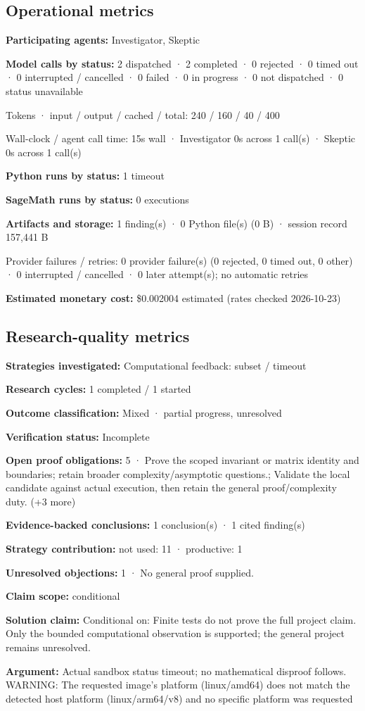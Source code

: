 \documentclass[11pt]{article}
\begin{document}
\subsection{Operational metrics}
\textbf{Participating agents:} Investigator, Skeptic\par
\textbf{Model calls by status:} 2 dispatched · 2 completed · 0 rejected · 0 timed out · 0 interrupted / cancelled · 0 failed · 0 in progress · 0 not dispatched · 0 status unavailable\par
Tokens · input / output / cached / total: 240 / 160 / 40 / 400\par
Wall-clock / agent call time: 15s wall · Investigator 0s across 1 call(s) · Skeptic 0s across 1 call(s)\par
\textbf{Python runs by status:} 1 timeout\par
\textbf{SageMath runs by status:} 0 executions\par
\textbf{Artifacts and storage:} 1 finding(s) · 0 Python file(s) (0 B) · session record 157,441 B\par
Provider failures / retries: 0 provider failure(s) (0 rejected, 0 timed out, 0 other) · 0 interrupted / cancelled · 0 later attempt(s); no automatic retries\par
\textbf{Estimated monetary cost:} \$0.002004 estimated (rates checked 2026-10-23)\par
\subsection{Research-quality metrics}
\textbf{Strategies investigated:} Computational feedback: subset / timeout\par
\textbf{Research cycles:} 1 completed / 1 started\par
\textbf{Outcome classification:} Mixed · partial progress, unresolved\par
\textbf{Verification status:} Incomplete\par
\textbf{Open proof obligations:} 5 · Prove the scoped invariant or matrix identity and boundaries; retain broader complexity/asymptotic questions.; Validate the local candidate against actual execution, then retain the general proof/complexity duty. (+3 more)\par
\textbf{Evidence-backed conclusions:} 1 conclusion(s) · 1 cited finding(s)\par
\textbf{Strategy contribution:} not used: 11 · productive: 1\par
\textbf{Unresolved objections:} 1 · No general proof supplied.\par
\textbf{Claim scope:} conditional\par
\textbf{Solution claim:} Conditional on: Finite tests do not prove the full project claim. Only the bounded computational observation is supported; the general project remains unresolved.\par
\textbf{Argument:} Actual sandbox status timeout; no mathematical disproof follows. WARNING: The requested image's platform (linux/amd64) does not match the detected host platform (linux/arm64/v8) and no specific platform was requested
\end{document}
